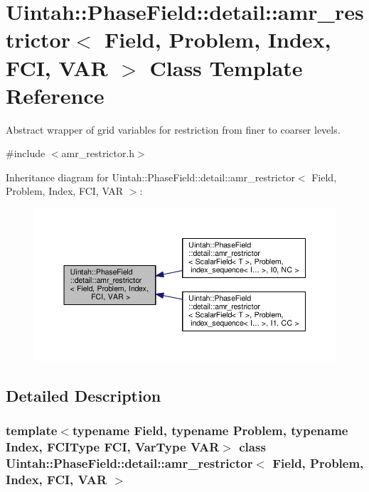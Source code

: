 \hypertarget{classUintah_1_1PhaseField_1_1detail_1_1amr__restrictor}{}\section{Uintah\+:\+:Phase\+Field\+:\+:detail\+:\+:amr\+\_\+restrictor$<$ Field, Problem, Index, F\+CI, V\+AR $>$ Class Template Reference}
\label{classUintah_1_1PhaseField_1_1detail_1_1amr__restrictor}


Abstract wrapper of grid variables for restriction from finer to coarser levels.  




{\ttfamily \#include $<$amr\+\_\+restrictor.\+h$>$}



Inheritance diagram for Uintah\+:\+:Phase\+Field\+:\+:detail\+:\+:amr\+\_\+restrictor$<$ Field, Problem, Index, F\+CI, V\+AR $>$\+:\nopagebreak
\begin{figure}[H]
\begin{center}
\leavevmode
\includegraphics[width=350pt]{classUintah_1_1PhaseField_1_1detail_1_1amr__restrictor__inherit__graph}
\end{center}
\end{figure}


\subsection{Detailed Description}
\subsubsection*{template$<$typename Field, typename Problem, typename Index, F\+C\+I\+Type F\+CI, Var\+Type V\+AR$>$\newline
class Uintah\+::\+Phase\+Field\+::detail\+::amr\+\_\+restrictor$<$ Field, Problem, Index, F\+C\+I, V\+A\+R $>$}


